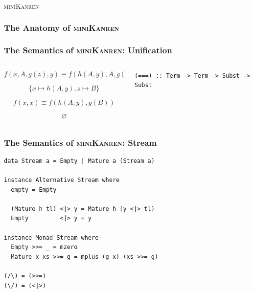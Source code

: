 \documentclass[xcolor={dvipsnames}, aspectratio=169]{beamer}
\renewcommand{\emptyset}{\varnothing}
\newcommand{\mk}{\textsc{miniKanren}\xspace}
\begin{document}
\begin{frame}[fragile]
  \frametitle{}

\begin{center}
  \Large \mk
\end{center}

\end{frame}

\begin{frame}[fragile]
  \frametitle{The Anatomy of \mk}



\end{frame}

\begin{frame}[fragile]
  \frametitle{The Semantics of \mk: Unification}

\begin{columns}
  \begin{column}{0.45\textwidth}
    \[ f(x, A, g(z), y) \equiv f(h(A, y), A, g(B), y)\] 
  
    \vspace{-0.4cm}
  
    \[ \{x \mapsto h(A, y), z \mapsto B \} \]
  
    \vspace{0.8cm}
  
    \[ f(x, x) \equiv f(h(A, y), g(B))\] 

    \vspace{-0.4cm}

    \[ \emptyset \]
  
  \end{column}
  
  \begin{column}{0.45\textwidth}

    \begin{lstlisting}[language=ocanren]
 (===) :: Term -> Term -> Subst -> Subst 
    \end{lstlisting}
  \end{column}
\end{columns}

\end{frame}

\begin{frame}[fragile]
  \frametitle{The Semantics of \mk: Stream}
    \begin{lstlisting}[language=ocanren]
data Stream a = Empty | Mature a (Stream a) 

instance Alternative Stream where
  empty = Empty

  (Mature h tl) <|> y = Mature h (y <|> tl)
  Empty         <|> y = y

instance Monad Stream where
  Empty >>= _ = mzero
  Mature x xs >>= g = mplus (g x) (xs >>= g)

(/\) = (>>=)
(\/) = (<|>)
    \end{lstlisting} 
\end{frame}
\end{document}

